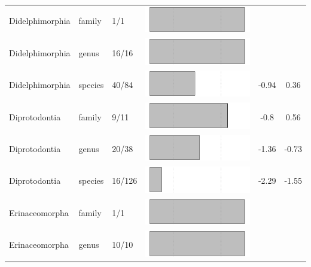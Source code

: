 \begin{longtable}{lL{1.8cm}C{2cm}ccc}
  Didelphimorphia & family & 1/1 & \includegraphics[width=0.20\linewidth, height=0.05\linewidth]{Missing_mammals/Table_figures/bar22.pdf} &   &   \\ 
  Didelphimorphia & genus & 16/16 & \includegraphics[width=0.20\linewidth, height=0.05\linewidth]{Missing_mammals/Table_figures/bar23.pdf} &   &   \\ 
  Didelphimorphia & species & 40/84 & \includegraphics[width=0.20\linewidth, height=0.05\linewidth]{Missing_mammals/Table_figures/bar24.pdf} & -0.94 & 0.36 \\ 
  Diprotodontia & family & 9/11 & \includegraphics[width=0.20\linewidth, height=0.05\linewidth]{Missing_mammals/Table_figures/bar25.pdf} & -0.8 & 0.56 \\ 
  Diprotodontia & genus & 20/38 & \includegraphics[width=0.20\linewidth, height=0.05\linewidth]{Missing_mammals/Table_figures/bar26.pdf} & -1.36 & -0.73 \\ 
  Diprotodontia & species & 16/126 & \includegraphics[width=0.20\linewidth, height=0.05\linewidth]{Missing_mammals/Table_figures/bar27.pdf} & -2.29 & -1.55 \\ 
  Erinaceomorpha & family & 1/1 & \includegraphics[width=0.20\linewidth, height=0.05\linewidth]{Missing_mammals/Table_figures/bar28.pdf} &   &   \\ 
  Erinaceomorpha & genus & 10/10 & \includegraphics[width=0.20\linewidth, height=0.05\linewidth]{Missing_mammals/Table_figures/bar29.pdf} &   &   \\ 

\end{longtable}
